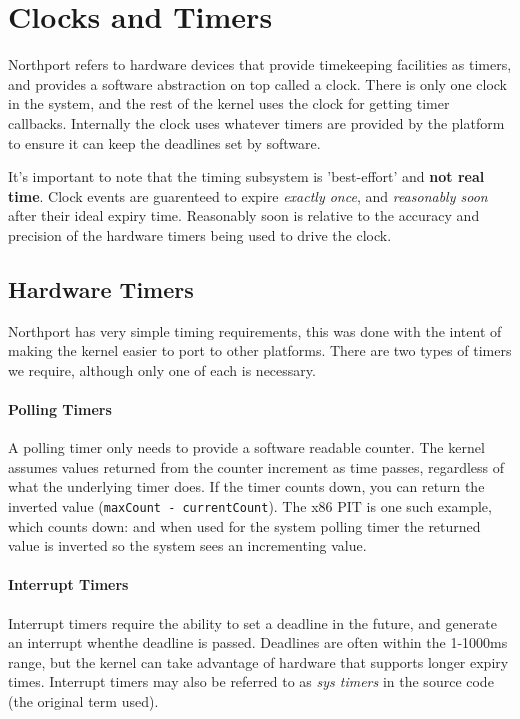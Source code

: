 \section{Clocks and Timers}
\label{Clock}
Northport refers to hardware devices that provide timekeeping facilities as timers, and provides a software abstraction on top called a clock. There is only one clock in the system, and the rest of the kernel uses the clock for getting timer callbacks. Internally the clock uses whatever timers are provided by the platform to ensure it can keep the deadlines set by software.

It's important to note that the timing subsystem is 'best-effort' and \textbf{not real time}. Clock events are guarenteed to expire \textit{exactly once}, and \textit{reasonably soon} after their ideal expiry time. Reasonably soon is relative to the accuracy and precision of the hardware timers being used to drive the clock.

\subsection{Hardware Timers}
Northport has very simple timing requirements, this was done with the intent of making the kernel easier to port to other platforms. There are two types of timers we require, although only one of each is necessary.

\paragraph{Polling Timers}
A polling timer only needs to provide a software readable counter. The kernel assumes values returned from the counter increment as time passes, regardless of what the underlying timer does. If the timer counts down, you can return the inverted value (\verb|maxCount - currentCount|). The x86 PIT is one such example, which counts down: and when used for the system polling timer the returned value is inverted so the system sees an incrementing value.

\paragraph{Interrupt Timers}
Interrupt timers require the ability to set a deadline in the future, and generate an interrupt whenthe deadline is passed. Deadlines are often within the 1-1000ms range, but the kernel can take advantage of hardware that supports longer expiry times. Interrupt timers may also be referred to as \textit{sys timers} in the source code (the original term used).

